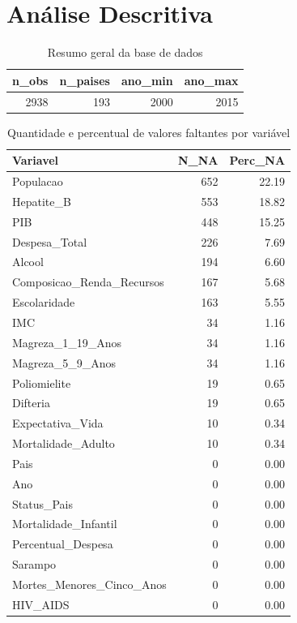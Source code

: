 \documentclass[
  12pt,
]{article}
\begin{document}
\section{Análise Descritiva}\label{anuxe1lise-descritiva}

\begin{longtable}[t]{rrrr}
\caption{\label{tab:unnamed-chunk-4}Resumo geral da base de dados}\\
\toprule
n\_obs & n\_paises & ano\_min & ano\_max\\
\midrule
2938 & 193 & 2000 & 2015\\
\bottomrule
\end{longtable}

\begin{longtable}[t]{lrr}
\caption{\label{tab:unnamed-chunk-5}Quantidade e percentual de valores faltantes por variável}\\
\toprule
Variavel & N\_NA & Perc\_NA\\
\midrule
Populacao & 652 & 22.19\\
Hepatite\_B & 553 & 18.82\\
PIB & 448 & 15.25\\
Despesa\_Total & 226 & 7.69\\
Alcool & 194 & 6.60\\
\addlinespace
Composicao\_Renda\_Recursos & 167 & 5.68\\
Escolaridade & 163 & 5.55\\
IMC & 34 & 1.16\\
Magreza\_1\_19\_Anos & 34 & 1.16\\
Magreza\_5\_9\_Anos & 34 & 1.16\\
\addlinespace
Poliomielite & 19 & 0.65\\
Difteria & 19 & 0.65\\
Expectativa\_Vida & 10 & 0.34\\
Mortalidade\_Adulto & 10 & 0.34\\
Pais & 0 & 0.00\\
\addlinespace
Ano & 0 & 0.00\\
Status\_Pais & 0 & 0.00\\
Mortalidade\_Infantil & 0 & 0.00\\
Percentual\_Despesa & 0 & 0.00\\
Sarampo & 0 & 0.00\\
\addlinespace
Mortes\_Menores\_Cinco\_Anos & 0 & 0.00\\
HIV\_AIDS & 0 & 0.00\\
\bottomrule
\end{longtable}
\end{document}
